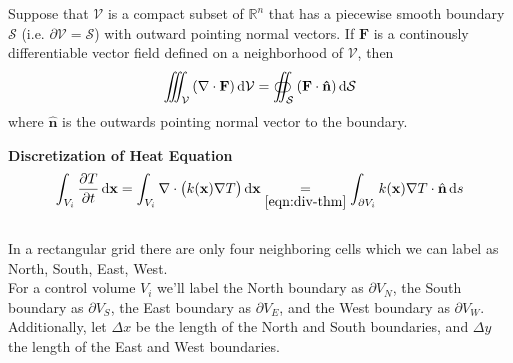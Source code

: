 \documentclass[final]{beamer}
\begin{document}
\begin{frame}[plain]
	\begin{theorem}
		Suppose that $\mathcal{V}$ is a compact subset of $\mathbb{R}^n$ that has a piecewise smooth boundary $\mathcal{S}$ (i.e. $\partial\mathcal{V}=\mathcal{S}$) with outward pointing normal vectors. If $\mathbf{F}$ is a continously differentiable vector field defined on a neighborhood of $\mathcal{V}$, then
		\begin{equation}
			\iiint_{\mathcal{V}}\left(\nabla\cdot\mathbf{F}\right)\dif\mathcal{V}=\oiint_{\mathcal{S}}\left(\mathbf{F}\cdot\mathbf{\hat{n}}\right)\dif\mathcal{S}\label{eqn:div-thm}
		\end{equation}
		where $\hat{\mathbf{n}}$ is the outwards pointing normal vector to the boundary.
		\label{thm:div-thm}
	\end{theorem}
\end{frame}

\begin{frame}[t]{\bf Discretization of Heat Equation}
	\begin{equation}
		\int_{V_i}\frac{\partial T}{\partial t}\dif\mathbf{x}=\int_{V_i}\nabla\cdot \left(k(\mathbf{x})\nabla T\right)\dif\mathbf{x}\underset{\eqref{eqn:div-thm}}{=}\int_{\partial V_i}k(\mathbf{x})\nabla T\cdot\hat{\mathbf{n}}\dif s\label{eqn:Vol-to-Surface-FVM}
	\end{equation}\\
	\vspace{1em}
	\pause
	In a rectangular grid there are only four neighboring cells which we can label as North, South, East, West.\\\vspace{1em}
	\pause
	For a control volume $V_i$ we'll label the North boundary as $\partial V_N$, the South boundary as $\partial V_S$, the East boundary as $\partial V_E$, and the West boundary as $\partial V_W$.\\\vspace{1em}
	\pause
	Additionally, let $\Delta x$ be the length of the North and South boundaries, and $\Delta y$ the length of the East and West boundaries.
\end{frame}
\end{document}
